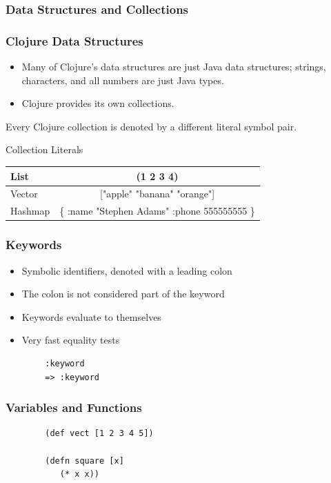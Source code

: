 \documentclass[xcolor=dvipsnames]{beamer}
\begin{document}
		\subsubsection{Data Structures and Collections}	
		\begin{frame}[fragile]
		\frametitle{Clojure Data Structures}
			\begin{itemize}			
			\item Many of Clojure's data structures are just Java data structures; strings, characters, and all numbers are just Java types.
			\pause
			\item Clojure provides its own collections.
			\end{itemize}
		\end{frame}
		\begin{frame}
		Every Clojure collection is denoted by a different literal symbol pair.
			\begin{block}{Collection Literals}
				\begin{table}[H]
				\begin{tabular}{ | l | c | }
				\hline
				List & (1 2 3 4) \\ \hline
				Vector & ["apple" "banana" "orange"] \\ \hline
				Hashmap & \{ :name "Stephen Adams" :phone 555555555 \} \\ \hline
				\end{tabular}
				\end{table}
			\end{block}
		\end{frame}
		
		\begin{frame}[fragile]
		\frametitle{Keywords}
		\begin{itemize}
			\item Symbolic identifiers, denoted with a leading colon
			\item The colon is not considered part of the keyword
			\item Keywords evaluate to themselves
			\item Very fast equality tests 
		\end{itemize}
		\begin{verbatim}
		:keyword
		=> :keyword
		\end{verbatim}
		\end{frame}
		
		\begin{frame}[fragile]
		\frametitle{Variables and Functions}
		\begin{verbatim}
		(def vect [1 2 3 4 5])
		
		(defn square [x] 
		   (* x x))
		\end{verbatim}	
		\end{frame}
		
\end{document}
